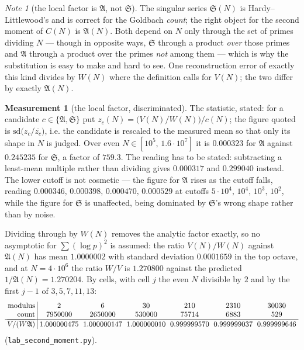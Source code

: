 \documentclass[11pt,a4paper]{article}
\theoremstyle{plain}
\theoremstyle{definition}
\newtheorem{measurement}[theorem]{Measurement}
\theoremstyle{remark}
\newtheorem{note}[theorem]{Note}
\renewcommand{\SS}{\mathfrak{S}}
\newcommand{\AAA}{\mathfrak{A}}
\begin{document}
\begin{note}[the local factor is $\AAA$, not $\SS$]\label{note:AvsS}
The singular series $\SS(N)$ is Hardy--Littlewood's and is correct for
the Goldbach \emph{count}; the right object for the second moment of
$C(N)$ is $\AAA(N)$. Both depend on $N$ only through the set of primes
dividing $N$ --- though in opposite ways, $\SS$ through a product
\emph{over} those primes and $\AAA$ through a product over the primes
\emph{not} among them --- which is why the substitution is easy to
make and hard to see. One reconstruction error of exactly this kind
divides by $W(N)$ where the definition calls for $V(N)$; the two
differ by exactly $\AAA(N)$.
\end{note}

\begin{measurement}[the local factor, discriminated]\label{meas:V}
The statistic, stated: for a candidate $c\in\{\AAA,\SS\}$ put
$z_c(N)=\bigl(V(N)/W(N)\bigr)/c(N)$; the figure quoted is
$\mathrm{sd}\bigl(z_c/\overline{z_c}\bigr)$, i.e. the candidate is
rescaled to the measured mean so that only its shape in $N$ is judged.
Over even $N\in[10^5,\,1.6\cdot10^7]$ it is $0.000323$ for $\AAA$
against $0.245235$ for $\SS$, a factor of $759.3$. The reading has to
be stated: subtracting a least-mean multiple rather than dividing
gives $0.000317$ and $0.299040$ instead. The lower cutoff is not
cosmetic --- the figure for $\AAA$ rises as the cutoff falls, reading
$0.000346,\,0.000398,\,0.000470,\,0.000529$ at cutoffs
$5\cdot10^4,\,10^4,\,10^3,\,10^2$, while the figure for $\SS$ is
unaffected, being dominated by $\SS$'s wrong shape rather than by
noise.

Dividing through by $W(N)$ removes the analytic factor exactly, so no
asymptotic for $\sum(\log p)^2$ is assumed: the ratio $V(N)/W(N)$
against $\AAA(N)$ has mean $1.0000002$ with standard deviation
$0.0001659$ in the top octave, and at $N=4\cdot10^6$ the ratio $W/V$
is $1.270800$ against the predicted $1/\AAA(N)=1.270204$. By cells,
with cell $j$ the even $N$ divisible by $2$ and by the first $j-1$ of
$3,5,7,11,13$:
\[
\setlength{\arraycolsep}{3pt}
\begin{array}{r|cccccc}
 \text{modulus} & 2 & 6 & 30 & 210 & 2310 & 30030\\
 \text{count} & 7950000 & 2650000 & 530000 & 75714 & 6883 & 529\\\hline
 \overline{V/(W\AAA)} & 1.000000475 & 1.000000147 & 1.000000010
   & 0.999999570 & 0.999999037 & 0.999999646
\end{array}
\]
(\texttt{lab\_second\_moment.py}).
\end{measurement}
\end{document}
